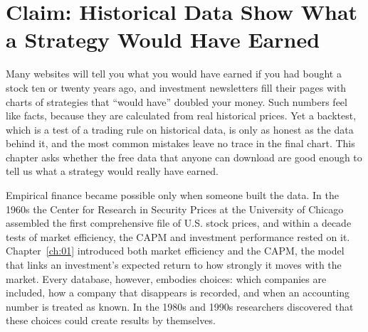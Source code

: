 \makeatletter
{}
\makeatother

\chapter{Claim: Historical Data Show What a Strategy Would Have Earned}
\label{ch:02}
\providecommand{\term}[1]{\emph{#1}}

Many websites will tell you what you would have earned if you had bought a stock ten or twenty years ago, and investment newsletters fill their pages with charts of strategies that ``would have'' doubled your money. Such numbers feel like facts, because they are calculated from real historical prices. Yet a backtest, which is a test of a trading rule on historical data, is only as honest as the data behind it, and the most common mistakes leave no trace in the final chart. This chapter asks whether the free data that anyone can download are good enough to tell us what a strategy would really have earned.

Empirical finance became possible only when someone built the data. In the 1960s the Center for Research in Security Prices at the University of Chicago assembled the first comprehensive file of U.S. stock prices, and within a decade tests of market efficiency, the CAPM and investment performance rested on it. Chapter~\ref{ch:01} introduced both market efficiency and the CAPM, the model that links an investment's expected return to how strongly it moves with the market. Every database, however, embodies choices: which companies are included, how a company that disappears is recorded, and when an accounting number is treated as known. In the 1980s and 1990s researchers discovered that these choices could create results by themselves.


